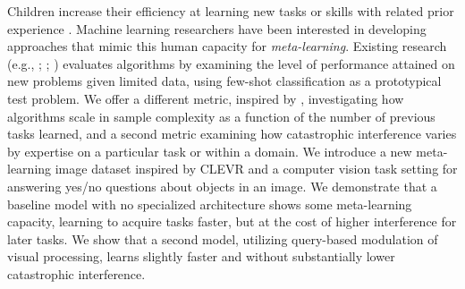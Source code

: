 Children increase their efficiency at learning new tasks or skills with related prior experience \parencite{Brown1988a}. Machine learning researchers have been interested in developing approaches that mimic this human capacity for \emph{meta-learning}. Existing research (e.g., \cite{Santoro2016}; \cite{Finn2017}; \cite{Mishra2018}) evaluates algorithms by examining the level of performance attained on new problems given limited data, using few-shot classification as a prototypical test problem. We offer a different metric, inspired by \textcite{Thrun1996}, investigating how algorithms scale in sample complexity as a function of the number of previous tasks learned, and a second metric examining how catastrophic interference varies by expertise on a particular task or within a domain. We introduce a new meta-learning image dataset inspired by CLEVR \textcite{Johnson2017} and a computer vision task setting for answering yes/no questions about objects in an image. We demonstrate that a baseline model with no specialized architecture shows some meta-learning capacity, learning to acquire tasks faster, but at the cost of higher interference for later tasks. We show that a second model, utilizing query-based modulation of visual processing, learns slightly faster and without substantially lower catastrophic interference.
